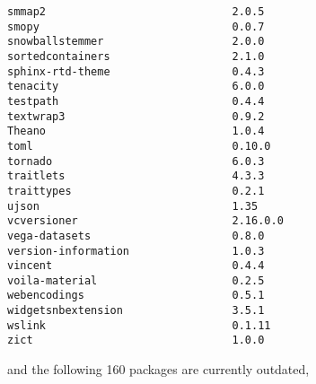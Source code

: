 \documentclass[11pt,a4paper]{article}
\begin{document}
\begin{verbatim}
smmap2                             2.0.5
smopy                              0.0.7
snowballstemmer                    2.0.0
sortedcontainers                   2.1.0
sphinx-rtd-theme                   0.4.3
tenacity                           6.0.0
testpath                           0.4.4
textwrap3                          0.9.2
Theano                             1.0.4
toml                               0.10.0
tornado                            6.0.3
traitlets                          4.3.3
traittypes                         0.2.1
ujson                              1.35
vcversioner                        2.16.0.0
vega-datasets                      0.8.0
version-information                1.0.3
vincent                            0.4.4
voila-material                     0.2.5
webencodings                       0.5.1
widgetsnbextension                 3.5.1
wslink                             0.1.11
zict                               1.0.0
\end{verbatim}

and the following 160 packages are currently outdated,
\end{document}
